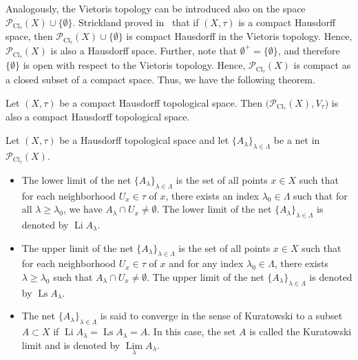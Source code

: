 \documentclass{svproc}
\def\Cl{\operatorname{Cl}}
\def\Li{\operatorname{Li}}
\def\Ls{\operatorname{Ls}}
\def\Lim{\operatorname{Lim}}
\begin{document}
Analogously, the Vietoris topology can be introduced also on the space $\mathcal{P}_{\Cl_{\tau}}(X)\cup\{\emptyset\}$. Strickland proved in~\cite[Theorem~21.48]{Strickland} that if $(X,\tau)$ is a compact Hausdorff space, then $\mathcal{P}_{\Cl_{\tau}}(X)\cup\{\emptyset\}$ is compact Hausdorff in the Vietoris topology. Hence, $\mathcal{P}_{\Cl_{\tau}}(X)$ is also a Hausdorff space. Further, note that $\emptyset^+ = \{\emptyset\}$, and therefore $\{\emptyset\}$ is open with respect to the Vietoris topology. Hence, $\mathcal{P}_{\Cl_{\tau}}(X)$ is compact as a closed subset of a compact space. Thus, we have the following theorem.

\begin{theorem}\label{thm:comp_hyp}
Let $(X, \tau)$ be a compact Hausdorff topological space. Then $\bigl(\mathcal{P}_{\Cl_{\tau}}(X), V_{\tau}\bigr)$ is also a compact Hausdorff topological space.
\end{theorem}

\begin{definition}
Let $(X, \tau)$ be a Hausdorff topological space and let $\{A_{\lambda}\}_{\lambda\in \Lambda}$ be a net in $\mathcal{P}_{\Cl_{\tau}}(X)$.
\begin{itemize}
\item The lower limit of the net $\{A_{\lambda}\}_{\lambda\in \Lambda}$ is the set of all points $x\in X$ such that for each neighborhood $U_x\in \tau$ of $x$, there exists an index $\lambda_0\in \Lambda$ such that for all $\lambda\ge \lambda_0$, we have $A_{\lambda}\cap U_x\neq\emptyset$. The lower limit of the net $\{A_{\lambda}\}_{\lambda\in \Lambda}$ is denoted by $\Li A_{\lambda}$.
\item The upper limit of the net $\{A_{\lambda}\}_{\lambda\in \Lambda}$ is the set of all points $x\in X$ such that for each neighborhood $U_x\in \tau$ of $x$ and for any index $\lambda_0\in \Lambda$, there exists $\lambda\ge \lambda_0$ such that $A_{\lambda}\cap U_x\neq\emptyset$. The upper limit of the net $\{A_{\lambda}\}_{\lambda\in \Lambda}$ is denoted by $\Ls A_{\lambda}$.
\item The net $\{A_{\lambda}\}_{\lambda\in \Lambda}$ is said to converge in the sense of Kuratowski to a subset $A\subset X$ if $\Li A_{\lambda} = \Ls A_{\lambda} = A$. In this case, the set $A$ is called the Kuratowski limit and is denoted by $\Lim\limits_{\lambda} A_{\lambda}$.
\end{itemize}
\end{definition}
\end{document}
